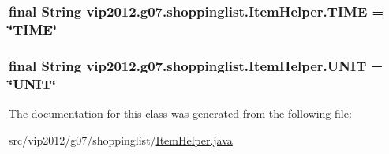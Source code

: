 \hypertarget{classvip2012_1_1g07_1_1shoppinglist_1_1ItemHelper_af4ed8a9409f4623fb7755b37431ad5c0}{
\subsubsection[{T\-I\-M\-E}]{\setlength{\rightskip}{0pt plus 5cm}final String vip2012.\-g07.\-shoppinglist.\-Item\-Helper.\-T\-I\-M\-E = \char`\"{}T\-I\-M\-E\char`\"{}\hspace{0.3cm}{\ttfamily [static]}}}\label{classvip2012_1_1g07_1_1shoppinglist_1_1ItemHelper_af4ed8a9409f4623fb7755b37431ad5c0}
\hypertarget{classvip2012_1_1g07_1_1shoppinglist_1_1ItemHelper_a4b2f6f4439ec7a2ecc1a7bc24805a2cb}{
\subsubsection[{U\-N\-I\-T}]{\setlength{\rightskip}{0pt plus 5cm}final String vip2012.\-g07.\-shoppinglist.\-Item\-Helper.\-U\-N\-I\-T = \char`\"{}U\-N\-I\-T\char`\"{}\hspace{0.3cm}{\ttfamily [static]}}}\label{classvip2012_1_1g07_1_1shoppinglist_1_1ItemHelper_a4b2f6f4439ec7a2ecc1a7bc24805a2cb}


The documentation for this class was generated from the following file\-:\begin{DoxyCompactItemize}
\item 
src/vip2012/g07/shoppinglist/\hyperlink{ItemHelper_8java}{Item\-Helper.\-java}\end{DoxyCompactItemize}
